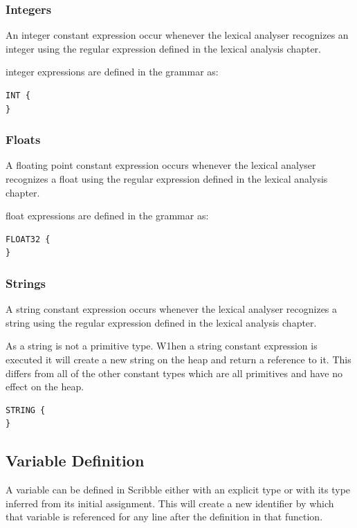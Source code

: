 \documentclass[]{final_report}
\begin{document}
\subsubsection{Integers}

An integer constant expression occur whenever the lexical analyser recognizes an integer using the regular expression defined in the lexical analysis chapter.

integer expressions are defined in the grammar as:
\begin{verbatim}
INT {
}
\end{verbatim}

\subsubsection{Floats}

A floating point constant expression occurs whenever the lexical analyser recognizes a float using the regular expression defined in the lexical analysis chapter.

float expressions are defined in the grammar as:
\begin{verbatim}
FLOAT32 {
}
\end{verbatim}

\subsubsection{Strings}

A string constant expression occurs whenever the lexical analyser recognizes a string using the regular expression defined in the lexical analysis chapter.

As a string is not a primitive type. W1hen a string constant expression is executed it will create a new string on the heap and return a reference to it. This differs from all of the other constant types which are all primitives and have no effect on the heap.

\begin{verbatim}
STRING {
}
\end{verbatim}

\subsection{Variable Definition}

A variable can be defined in Scribble either with an explicit type or with its type inferred from its initial assignment. This will create a new identifier by which that variable is referenced for any line after the definition in that function.
\end{document}

